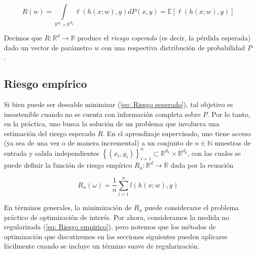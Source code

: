 \begin{equation}
\label{eq: Riesgo esperado}
R(w) = \int\limits_{\mathbb{R}^{d_x}\times \mathbb{R}^{d_y}} {\ell \left(h(x;w), y\right) dP(x,y)} = \mathbb{E} \left[ \ell \left( h(x;w), y \right) \right]
\end{equation}

Decimos que $R : \mathbb{R}^{d} \rightarrow \mathbb{R}$ produce el \textit{riesgo esperado} (es decir, la p\'erdida esperada) dado un vector de par\'ametro $w$ con una respectiva distribuci\'on de probabilidad $P$.

\subsection{Riesgo emp\'irico}
Si bien puede ser deseable minimizar (\ref{eq: Riesgo esperado}), tal objetivo es insostenible cuando no se cuenta con informaci\'on completa sobre $P$. Por lo tanto, en la pr\'actica, uno busca la soluci\'on de un problema que involucra una estimaci\'on del riesgo esperado $R$. En el aprendizaje supervisado, uno tiene acceso (ya sea de una vez o de manera incremental) a un conjunto de  $n \in \mathbb{N}$ muestras de entrada y salida independientes $\left\lbrace (x_i, y_i) \right\rbrace_{i=1}^{n} \subset \mathbb{R}^{d_x} \times \mathbb{R}^{d_y}$, con las cuales se puede definir la funci\'on de riesgo emp\'irico $R_n : \mathbb{R}^d \rightarrow \mathbb{R}$ dada por la ecuaci\'on 

\begin{equation}
\label{eq: Riesgo empirico}
R_n(\omega) = \frac{1}{n} \sum\limits_{i=1}^{n} {l \left( h(x;w), y\right)}
\end{equation}

En t\'erminos generales, la minimizaci\'on de $R_n$ puede considerarse el problema pr\'actico de optimizaci\'on de inter\'es. Por ahora, consideramos la medida no regularizada (\ref{eq: Riesgo empirico}), pero notemos que los m\'etodos de optimizaci\'on que discutiremos en las secciones siguientes pueden aplicarse f\'acilmente cuando se incluye un t\'ermino suave de regularizaci\'on.

